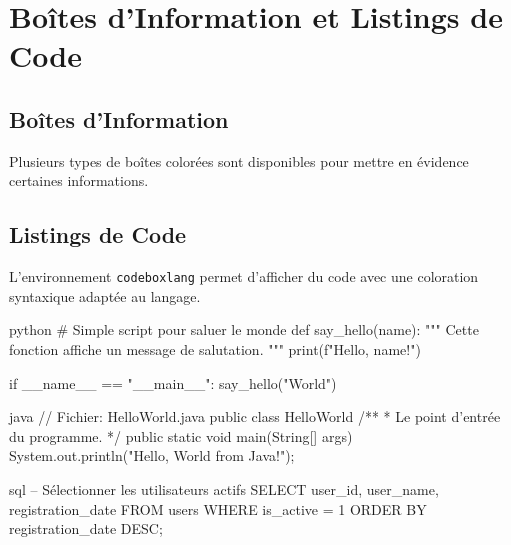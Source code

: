 \documentclass{butex}
\begin{document}
\section{Boîtes d'Information et Listings de Code}

\subsection{Boîtes d'Information}
Plusieurs types de boîtes colorées sont disponibles pour mettre en évidence certaines informations.





\subsection{Listings de Code}
L'environnement \texttt{codeboxlang} permet d'afficher du code avec une coloration syntaxique adaptée au langage.

\begin{codeboxlang}{python}
	# Simple script pour saluer le monde
	def say_hello(name):
	"""
	Cette fonction affiche un message de salutation.
	"""
	print(f"Hello, {name}!")
	
	if __name__ == "__main__":
	say_hello("World")
\end{codeboxlang}

\begin{codeboxlang}{java}
	// Fichier: HelloWorld.java
	public class HelloWorld {
		/**
		* Le point d'entrée du programme.
		*/
		public static void main(String[] args) {
			System.out.println("Hello, World from Java!"); 
		}
	}
\end{codeboxlang}

\begin{codeboxlang}{sql}
	-- Sélectionner les utilisateurs actifs
	SELECT
	user_id,
	user_name,
	registration_date
	FROM
	users
	WHERE
	is_active = 1
	ORDER BY
	registration_date DESC;
\end{codeboxlang}
\end{document}
